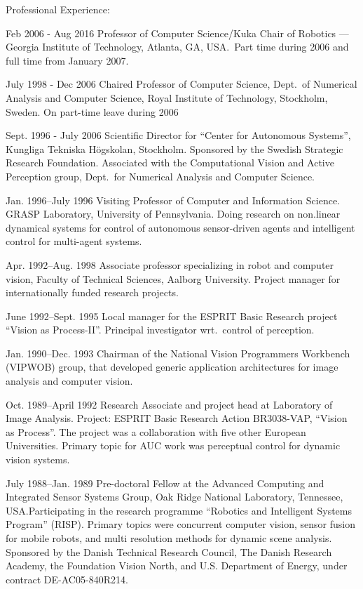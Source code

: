 \documentclass{article}
\begin{document}
\begin{cv}
\begin{cvlist}{Professional Experience:}
		\item[Feb 2006 - Aug 2016]  Professor of Computer Science/Kuka
		Chair of Robotics --- Georgia Institute of Technology, Atlanta, GA,
		USA.\ Part time during 2006 and full time from January 2007.

		\item[July 1998 - Dec 2006] Chaired Professor of Computer Science,
		Dept.\ of Numerical Analysis and Computer Science, Royal Institute
		of Technology, Stockholm, Sweden. On part-time leave during 2006

		\item[Sept. 1996 - July 2006] Scientific Director for ``Center for
		Autonomous Systems'', Kungliga Tek\-ni\-ska H\"og\-skolan,
		Stock\-holm.  Sponsored by the Swedish Strategic Research
		Foundation. Associated with the Computational Vision and Active
		Perception group, Dept.~for Numerical Analysis and Computer
		Science.

		\item[Jan. 1996--July 1996] Visiting Professor of Computer and
		Information Science.  GRASP Laboratory, University of Pennsylvania.
		Doing research on non.linear dynamical systems for control of
		autonomous sensor-driven agents and intelligent control for
		multi-agent systems.

		\item[Apr. 1992--Aug. 1998] Associate professor specializing in robot
		and computer vision, Faculty of Technical Sciences, Aalborg
		University.  Project manager for internationally funded research
		projects.

		\item[June 1992--Sept. 1995] Local manager for the ESPRIT Basic
		Research project ``Vision as Process-II''.  Principal investigator
		wrt.\ control of perception.

		\item[Jan. 1990--Dec. 1993] Chairman of the National Vision Programmers
		Workbench (VIPWOB) group, that developed generic application architectures for
		image analysis and computer vision.

		\item[Oct. 1989--April 1992] Research Associate and project head at Laboratory
		of Image Analysis. Project: ESPRIT Basic Research Action BR3038-VAP, ``Vision
		as Process''. The project was a collaboration with five other European
		Universities. Primary topic for AUC work was perceptual control for dynamic
		vision systems.

		\item[July 1988--Jan. 1989] Pre-doctoral Fellow at the Advanced Computing and
		Integrated Sensor Systems Group, Oak Ridge National Laboratory, Tennessee,
		USA.\@ Participating in the research programme ``Robotics and Intelligent
		Systems Program'' (RISP). Primary topics were concurrent computer vision,
		sensor fusion for mobile robots, and multi resolution methods for dynamic
		scene analysis. Sponsored by the Danish Technical Research Council, The Danish
		Research Academy, the Foundation Vision North, and U.S. Department of Energy,
		under contract DE-AC05-840R214.\@


\end{cvlist}
\end{cv}
\end{document}
